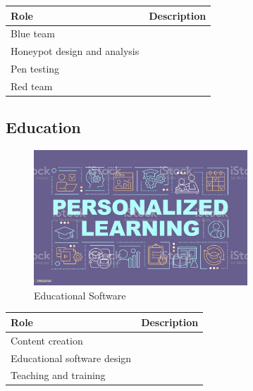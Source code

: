 \begin{table}[H]
	\begin{center}
		\begin{tabular}{p{1.3in}|p{3in}} 
			\textbf{Role} & \textbf{Description}\\
			\hline
			Blue team & \\
			\hline
			Honeypot design and analysis & \\
			\hline
			Pen testing & \\
			\hline
			Red team & \\
			\hline
		\end{tabular}
	\end{center}
\end{table}


\subsection{Education}

\begin{figure}[H]
	\begin{center}
		\caption{Educational Software}
		\vskip 4pt
		\includegraphics[height=2in]{images/careers/istockphoto-1394432243-1024x1024.jpg}
	\end{center}
\end{figure}

\begin{table}[H]
	\begin{center}
		\begin{tabular}{p{1.3in}|p{3in}} 
			\textbf{Role} & \textbf{Description}\\
			\hline
			Content creation & \\
			\hline
			Educational software design & \\
			\hline
			Teaching and training & \\
			\hline
		\end{tabular}
	\end{center}
\end{table}

